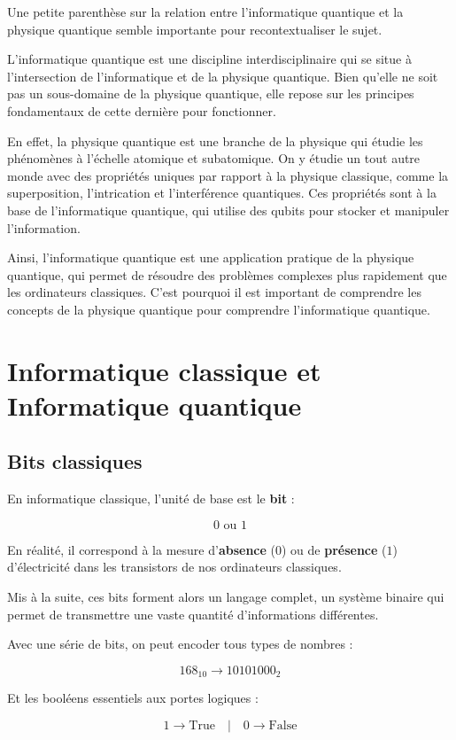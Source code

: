 \documentclass{article}
\begin{document}
Une petite parenthèse sur la relation entre l'informatique quantique et la physique quantique semble importante pour recontextualiser le sujet.

L'informatique quantique est une discipline interdisciplinaire qui se situe à l'intersection de l'informatique et de la physique quantique. Bien qu'elle ne soit pas un sous-domaine de la physique quantique, elle repose sur les principes fondamentaux de cette dernière pour fonctionner.

En effet, la physique quantique est une branche de la physique qui étudie les phénomènes à l'échelle atomique et subatomique. On y étudie un tout autre monde avec des propriétés uniques par rapport à la physique classique, comme la superposition, l'intrication et l'interférence quantiques. Ces propriétés sont à la base de l'informatique quantique, qui utilise des qubits pour stocker et manipuler l'information.

Ainsi, l'informatique quantique est une application pratique de la physique quantique, qui permet de résoudre des problèmes complexes plus rapidement que les ordinateurs classiques. C'est pourquoi il est important de comprendre les concepts de la physique quantique pour comprendre l'informatique quantique.

\break\section{Informatique classique et Informatique quantique}
\subsection{Bits classiques}
En informatique classique, l’unité de base est le \textbf{bit} :

\[ 0 \text{ ou } 1 \]

En réalité, il correspond à la mesure d’\textbf{absence} ($0$) ou de \textbf{présence} ($1$) d’électricité dans les transistors de nos ordinateurs classiques.

Mis à la suite, ces bits forment alors un langage complet, un système binaire qui permet de transmettre une vaste quantité d'informations différentes.

Avec une série de bits, on peut encoder tous types de nombres :

\[ 168_{10} \rightarrow 10101000_2 \]

Et les booléens essentiels aux portes logiques :

\[ 1 \rightarrow \text{True} \quad | \quad 0 \rightarrow \text{False} \]
\end{document}
